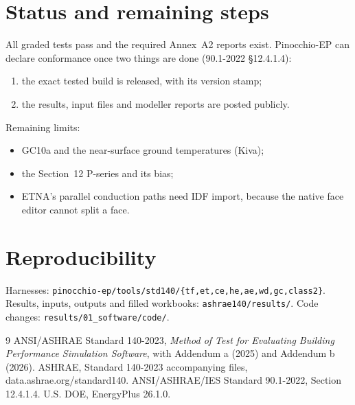 \documentclass[10pt,a4paper]{article}
\newcommand{\code}[1]{\texttt{\small #1}}
\begin{document}
\section{Status and remaining steps}
All graded tests pass and the required Annex~A2 reports exist. Pinocchio-EP can declare conformance once two
things are done (90.1-2022 \S12.4.1.4):
\begin{enumerate}
\item the exact tested build is released, with its version stamp;
\item the results, input files and modeller reports are posted publicly.
\end{enumerate}
Remaining limits:
\begin{itemize}
\item GC10a and the near-surface ground temperatures (Kiva);
\item the Section~12 P-series and its bias;
\item ETNA's parallel conduction paths need IDF import, because the native face editor cannot split a face.
\end{itemize}

\section*{Reproducibility}
Harnesses: \code{pinocchio-ep/tools/std140/\{tf,et,ce,he,ae,wd,gc,class2\}}. Results, inputs, outputs and filled
workbooks: \code{ashrae140/results/}. Code changes: \code{results/01\_software/code/}.

\begin{thebibliography}{9}\small
{} ANSI/ASHRAE Standard 140-2023, \emph{Method of Test for Evaluating Building Performance Simulation Software}, with Addendum a (2025) and Addendum b (2026).
 ASHRAE, Standard 140-2023 accompanying files, data.ashrae.org/standard140.
 ANSI/ASHRAE/IES Standard 90.1-2022, Section 12.4.1.4.
 U.S. DOE, EnergyPlus 26.1.0.
\end{thebibliography}
\end{document}
